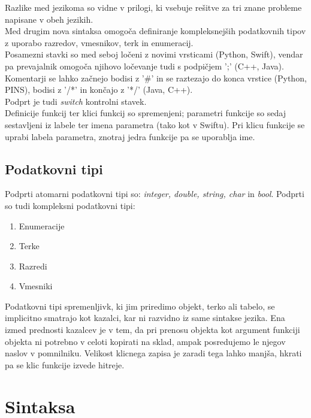 \documentclass[a4paper, 12p]{book}
\begin{document}
\noindent Razlike med jezikoma so vidne v prilogi, ki vsebuje rešitve za tri znane probleme napisane v obeh jezikih. \\
\indent Med drugim nova sintaksa omogoča definiranje kompleksnejših podatkovnih tipov z uporabo razredov, vmesnikov, terk in enumeracij. \\
\indent Posamezni stavki so med seboj ločeni z novimi vrsticami (Python, Swift), vendar pa prevajalnik omogoča njihovo ločevanje tudi s podpičjem ';' (C++, Java). \\
\indent Komentarji se lahko začnejo bodisi z '\#' in se raztezajo do konca vrstice (Python, PINS), bodisi z '/*' in končajo z '*/' (Java, C++). \\
\indent Podprt je tudi \textit{switch} kontrolni stavek. \\
\indent Definicije funkcij ter klici funkcij so spremenjeni; parametri funkcije so sedaj sestavljeni iz labele ter imena parametra (tako kot v Swiftu). Pri klicu funkcije se uprabi labela parametra, znotraj jedra funkcije pa se uporablja ime.

\subsection{Podatkovni tipi}

Podprti atomarni podatkovni tipi so: \textit{integer, double, string, char} in \textit{bool}. Podprti so tudi kompleksni podatkovni tipi:

\begin{enumerate}
	\item Enumeracije
	\item Terke
	\item Razredi
	\item Vmesniki
\end{enumerate}

\indent Podatkovni tipi spremenljivk, ki jim priredimo objekt, terko ali tabelo, se implicitno smatrajo kot kazalci, kar ni razvidno iz same sintakse jezika. Ena izmed prednosti kazalcev je v tem, da pri prenosu objekta kot argument funkciji objekta ni potrebno v celoti kopirati na sklad, ampak posredujemo le njegov naslov v pomnilniku. Velikost klicnega zapisa je zaradi tega lahko manjša, hkrati pa se klic funkcije izvede hitreje.

\section{Sintaksa}
\end{document}
